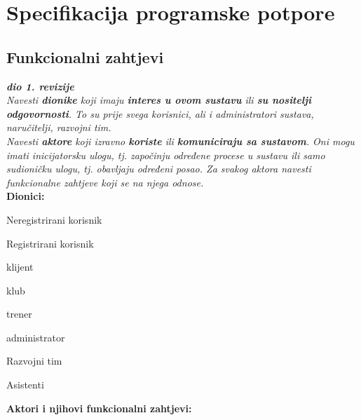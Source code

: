 \chapter{Specifikacija programske potpore}
		
	\section{Funkcionalni zahtjevi}
			
			\textbf{\textit{dio 1. revizije}}\\
			
			\textit{Navesti \textbf{dionike} koji imaju \textbf{interes u ovom sustavu} ili  \textbf{su nositelji odgovornosti}. To su prije svega korisnici, ali i administratori sustava, naručitelji, razvojni tim.}\\
				
			\textit{Navesti \textbf{aktore} koji izravno \textbf{koriste} ili \textbf{komuniciraju sa sustavom}. Oni mogu imati inicijatorsku ulogu, tj. započinju određene procese u sustavu ili samo sudioničku ulogu, tj. obavljaju određeni posao. Za svakog aktora navesti funkcionalne zahtjeve koji se na njega odnose.}\\
			
			
			\noindent \textbf{Dionici:}
			
	\begin{packed_enum}
				\item  Neregistrirani korisnik
				\item  Registrirani korisnik 
					\begin{packed_enum}
						
						\item  klijent
						\item  klub
						\item  trener
						\item administrator
				
					\end{packed_enum}

				\item Razvojni tim
				\item Asistenti
										
			\end{packed_enum}
			
			\noindent \textbf{Aktori i njihovi funkcionalni zahtjevi:}
			
